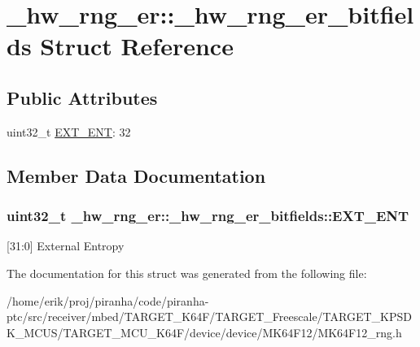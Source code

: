 \hypertarget{struct__hw__rng__er_1_1__hw__rng__er__bitfields}{}\section{\+\_\+hw\+\_\+rng\+\_\+er\+:\+:\+\_\+hw\+\_\+rng\+\_\+er\+\_\+bitfields Struct Reference}
\label{struct__hw__rng__er_1_1__hw__rng__er__bitfields}
\subsection*{Public Attributes}
\begin{DoxyCompactItemize}
\item 
uint32\+\_\+t \hyperlink{struct__hw__rng__er_1_1__hw__rng__er__bitfields_a1de4d7b1c40f7ed8bf5c7c2eae6bc4dc}{E\+X\+T\+\_\+\+E\+NT}\+: 32
\end{DoxyCompactItemize}


\subsection{Member Data Documentation}
\subsubsection[{\texorpdfstring{E\+X\+T\+\_\+\+E\+NT}{EXT_ENT}}]{\setlength{\rightskip}{0pt plus 5cm}uint32\+\_\+t \+\_\+hw\+\_\+rng\+\_\+er\+::\+\_\+hw\+\_\+rng\+\_\+er\+\_\+bitfields\+::\+E\+X\+T\+\_\+\+E\+NT}\hypertarget{struct__hw__rng__er_1_1__hw__rng__er__bitfields_a1de4d7b1c40f7ed8bf5c7c2eae6bc4dc}{}\label{struct__hw__rng__er_1_1__hw__rng__er__bitfields_a1de4d7b1c40f7ed8bf5c7c2eae6bc4dc}
\mbox{[}31\+:0\mbox{]} External Entropy 

The documentation for this struct was generated from the following file\+:\begin{DoxyCompactItemize}
\item 
/home/erik/proj/piranha/code/piranha-\/ptc/src/receiver/mbed/\+T\+A\+R\+G\+E\+T\+\_\+\+K64\+F/\+T\+A\+R\+G\+E\+T\+\_\+\+Freescale/\+T\+A\+R\+G\+E\+T\+\_\+\+K\+P\+S\+D\+K\+\_\+\+M\+C\+U\+S/\+T\+A\+R\+G\+E\+T\+\_\+\+M\+C\+U\+\_\+\+K64\+F/device/device/\+M\+K64\+F12/M\+K64\+F12\+\_\+rng.\+h\end{DoxyCompactItemize}
